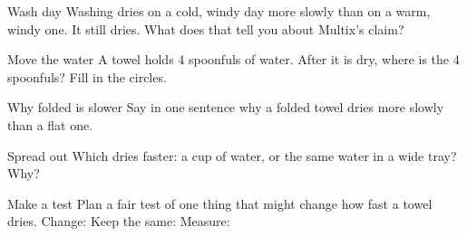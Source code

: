 \clearpage

\begin{puzzle}{Wash day}
Washing dries on a cold, windy day more slowly than on a warm, windy one. It still dries. What does that tell you about Multix's claim? \wline[6cm]
\end{puzzle}

\begin{puzzle}{Move the water}
A towel holds 4 spoonfuls of water. After it is dry, where is the 4 spoonfuls? Fill in the circles.
\begin{center}
\end{center}
\end{puzzle}

\begin{puzzle}{Why folded is slower}
Say in one sentence why a folded towel dries more slowly than a flat one. \wline[6cm]
\end{puzzle}

\begin{puzzle}{Spread out}
Which dries faster: a cup of water, or the same water in a wide tray? \wline[3cm]\\
Why? \wline[5cm]
\end{puzzle}

\begin{puzzle}{Make a test}
Plan a fair test of one thing that might change how fast a towel dries. Change: \wline[3cm] Keep the same: \wline[4cm] Measure: \wline[3cm]
\end{puzzle}
\clearpage
